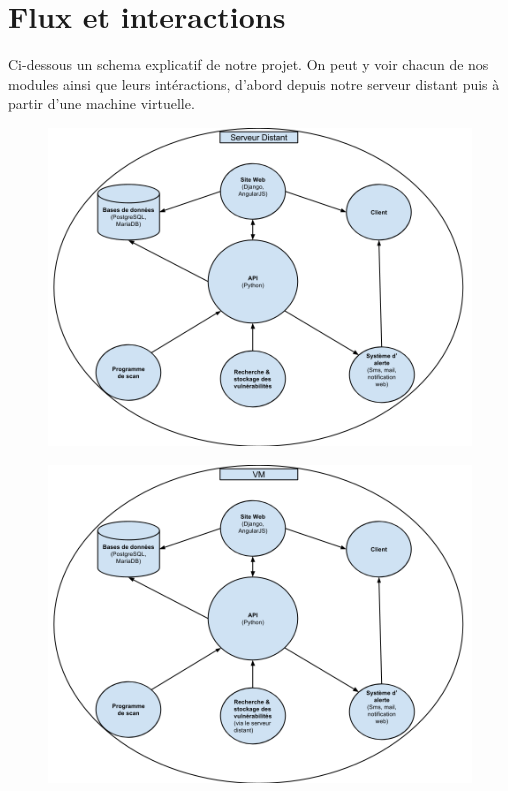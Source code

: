 \section{Flux et interactions}
Ci-dessous un schema explicatif de notre projet. On peut y voir chacun de nos modules ainsi que leurs intéractions, d'abord depuis notre serveur distant puis à partir d'une machine virtuelle. 
\begin{figure}[!h]
  \includegraphics[width=18cm]{serveur-distant.png}
\end{figure}

\begin{figure}
  \includegraphics[width=18cm]{vm.png}
\end{figure}